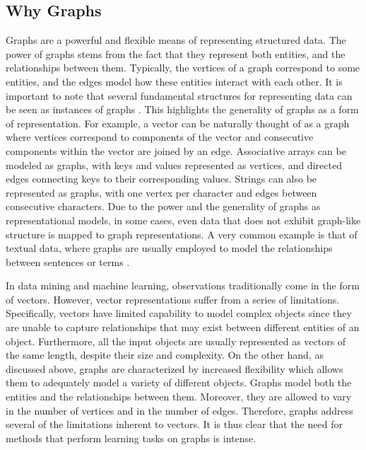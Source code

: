 \documentclass[twoside,11pt]{article}
\begin{document}
\subsection{Why Graphs}
Graphs are a powerful and flexible means of representing structured data.
The power of graphs stems from the fact that they represent both entities, and the relationships between them.
Typically, the vertices of a graph correspond to some entities, and the edges model how these entities interact with each other.
It is important to note that several fundamental structures for representing data can be seen as instances of graphs \cite{borgwardt2007graph}.
This highlights the generality of graphs as a form of representation.
For example, a vector can be naturally thought of as a graph where vertices correspond to components of the vector and consecutive components within the vector are joined by an edge.
Associative arrays can be modeled as graphs, with keys and values represented as vertices, and directed edges connecting keys to their corresponding values.
Strings can also be represented as graphs, with one vertex per character and edges between consecutive characters.
Due to the power and the generality of graphs as representational models, in some cases, even data that does not exhibit graph-like structure is mapped to graph representations.
A very common example is that of textual data, where graphs are usually employed to model the relationships between sentences or terms \cite{mihalcea2004textrank}.

In data mining and machine learning, observations traditionally come in the form of vectors.
However, vector representations suffer from a series of limitations.
Specifically, vectors have limited capability to model complex objects since they are unable to capture relationships that may exist between different entities of an object.
Furthermore, all the input objects are usually represented as vectors of the same length, despite their size and complexity.
On the other hand, as discussed above, graphs are characterized by increased flexibility which allows them to adequately model a variety of different objects.
Graphs model both the entities and the relationships between them.
Moreover, they are allowed to vary in the number of vertices and in the number of edges.
Therefore, graphs address several of the limitations inherent to vectors.
It is thus clear that the need for methods that perform learning tasks on graphs is intense.
\end{document}
